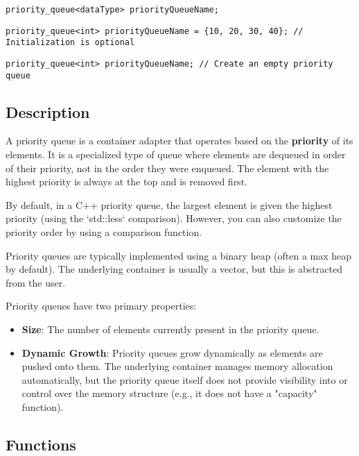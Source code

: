 \documentclass{article}
\begin{document}
\begin{lstlisting}
priority_queue<dataType> priorityQueueName; 
\end{lstlisting}

\begin{lstlisting}
priority_queue<int> priorityQueueName = {10, 20, 30, 40}; // Initialization is optional
\end{lstlisting}

\begin{lstlisting}
priority_queue<int> priorityQueueName; // Create an empty priority queue
\end{lstlisting}

\subsection{Description}

A priority queue is a container adapter that operates based on the \textbf{priority} of its elements. It is a specialized type of queue where elements are dequeued in order of their priority, not in the order they were enqueued. The element with the highest priority is always at the top and is removed first.

\noindent By default, in a C++ priority queue, the largest element is given the highest priority (using the `std::less` comparison). However, you can also customize the priority order by using a comparison function.

\noindent Priority queues are typically implemented using a binary heap (often a max heap by default). The underlying container is usually a vector, but this is abstracted from the user.

\noindent Priority queues have two primary properties:
\begin{itemize}
    \item \textbf{Size}: The number of elements currently present in the priority queue.
    \item \textbf{Dynamic Growth}: Priority queues grow dynamically as elements are pushed onto them. The underlying container manages memory allocation automatically, but the priority queue itself does not provide visibility into or control over the memory structure (e.g., it does not have a "capacity" function).
\end{itemize}

\subsection{Functions}
\end{document}
